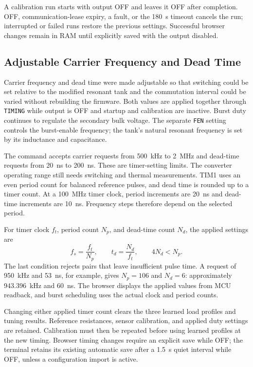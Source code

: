A calibration run starts with output OFF and leaves it OFF after completion. OFF, communication-lease expiry, a fault, or the \SI{180}{\second} timeout cancels the run; interrupted or failed runs restore the previous settings. Successful browser changes remain in RAM until explicitly saved with the output disabled.

\subsection{Adjustable Carrier Frequency and Dead Time}
\label{sec:ctrl-v2-adjustable-timing}

Carrier frequency and dead time were made adjustable so that switching could be set relative to the modified resonant tank and the commutation interval could be varied without rebuilding the firmware. Both values are applied together through \texttt{TIMING} while output is OFF and startup and calibration are inactive. Burst duty continues to regulate the secondary bulk voltage. The separate \texttt{FEN} setting controls the burst-enable frequency; the tank's natural resonant frequency is set by its inductance and capacitance.

The command accepts carrier requests from \SI{500}{\kilo\hertz} to \SI{2}{\mega\hertz} and dead-time requests from \SI{20}{\nano\second} to \SI{200}{\nano\second}. These are timer-setting limits. The converter operating range still needs switching and thermal measurements. TIM1 uses an even period count for balanced reference pulses, and dead time is rounded up to a timer count. At a \SI{100}{\mega\hertz} timer clock, period increments are \SI{20}{\nano\second} and dead-time increments are \SI{10}{\nano\second}. Frequency steps therefore depend on the selected period.

For timer clock \(f_t\), period count \(N_p\), and dead-time count \(N_d\), the applied settings are
\begin{equation}
 f_s=\frac{f_t}{N_p},\qquad t_d=\frac{N_d}{f_t},\qquad 4N_d<N_p.
 \label{eq:ctrl-v2-carrier-timing}
\end{equation}
The last condition rejects pairs that leave insufficient pulse time. A request of \SI{950}{\kilo\hertz} and \SI{53}{\nano\second}, for example, gives \(N_p=106\) and \(N_d=6\): approximately \SI{943.396}{\kilo\hertz} and \SI{60}{\nano\second}. The browser displays the applied values from MCU readback, and burst scheduling uses the actual clock and period counts.

Changing either applied timer count clears the three learned load profiles and tuning results. Reference resistances, sensor calibration, and applied duty settings are retained. Calibration must then be repeated before using learned profiles at the new timing. Browser timing changes require an explicit save while OFF; the terminal retains its existing automatic save after a \SI{1.5}{\second} quiet interval while OFF, unless a configuration import is active.

